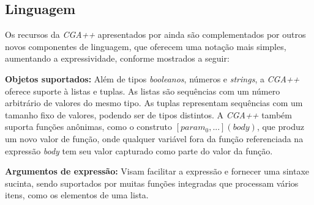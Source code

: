 \begin{figure}[h!]
	\centering
	\captionsetup{width=13cm}
	{}
\end{figure}

\subsection{Linguagem}
\label{sec:linguagem_cga++}

Os recursos da \textit{CGA++} apresentados por  ainda são complementados por outros novos componentes de linguagem, que oferecem uma notação mais simples, aumentando a expressividade, conforme mostrados a seguir:

\textbf{Objetos suportados:} Além de tipos \textit{booleanos}, números e \textit{strings}, a \textit{CGA++} oferece suporte à listas e tuplas. As listas são sequências com um número arbitrário de valores do mesmo tipo. As tuplas representam sequências com um tamanho fixo de valores, podendo ser de tipos distintos. A \textit{CGA++} também suporta funções anônimas, como o construto $[param_0, ...](body)$, que produz um novo valor de função, onde qualquer variável fora da função referenciada na expressão \textit{body} tem seu valor capturado como parte do valor da função.

\textbf{Argumentos de expressão:} Visam facilitar a expressão e fornecer uma sintaxe sucinta, sendo suportados por muitas funções integradas que processam vários itens, como os elementos de uma lista.

